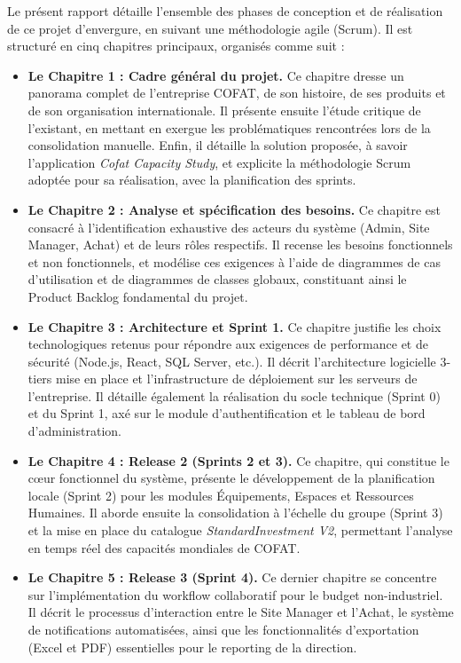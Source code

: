 Le présent rapport détaille l'ensemble des phases de conception et de réalisation de ce projet d'envergure, en suivant une méthodologie agile (Scrum). Il est structuré en cinq chapitres principaux, organisés comme suit :

\begin{itemize}
    \item \textbf{Le Chapitre 1 : Cadre général du projet.} Ce chapitre dresse un panorama complet de l'entreprise COFAT, de son histoire, de ses produits et de son organisation internationale. Il présente ensuite l'étude critique de l'existant, en mettant en exergue les problématiques rencontrées lors de la consolidation manuelle. Enfin, il détaille la solution proposée, à savoir l'application \textit{Cofat Capacity Study}, et explicite la méthodologie Scrum adoptée pour sa réalisation, avec la planification des sprints.
    
    \item \textbf{Le Chapitre 2 : Analyse et spécification des besoins.} Ce chapitre est consacré à l'identification exhaustive des acteurs du système (Admin, Site Manager, Achat) et de leurs rôles respectifs. Il recense les besoins fonctionnels et non fonctionnels, et modélise ces exigences à l'aide de diagrammes de cas d'utilisation et de diagrammes de classes globaux, constituant ainsi le Product Backlog fondamental du projet.
    
    \item \textbf{Le Chapitre 3 : Architecture et Sprint 1.} Ce chapitre justifie les choix technologiques retenus pour répondre aux exigences de performance et de sécurité (Node.js, React, SQL Server, etc.). Il décrit l'architecture logicielle 3-tiers mise en place et l'infrastructure de déploiement sur les serveurs de l'entreprise. Il détaille également la réalisation du socle technique (Sprint 0) et du Sprint 1, axé sur le module d'authentification et le tableau de bord d'administration.
    
    \item \textbf{Le Chapitre 4 : Release 2 (Sprints 2 et 3).} Ce chapitre, qui constitue le cœur fonctionnel du système, présente le développement de la planification locale (Sprint 2) pour les modules Équipements, Espaces et Ressources Humaines. Il aborde ensuite la consolidation à l'échelle du groupe (Sprint 3) et la mise en place du catalogue \textit{StandardInvestment V2}, permettant l'analyse en temps réel des capacités mondiales de COFAT.
    
    \item \textbf{Le Chapitre 5 : Release 3 (Sprint 4).} Ce dernier chapitre se concentre sur l'implémentation du workflow collaboratif pour le budget non-industriel. Il décrit le processus d'interaction entre le Site Manager et l'Achat, le système de notifications automatisées, ainsi que les fonctionnalités d'exportation (Excel et PDF) essentielles pour le reporting de la direction.
\end{itemize}

